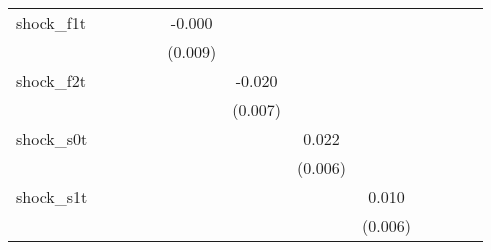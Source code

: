 {\begin{tabular}{l*{12}{c}}
\addlinespace
shock\_f1t   &                     &                     &                     &                     &      -0.000         &                     &                     &                     &                     &                     &                     &                     \\
            &                     &                     &                     &                     &     (0.009)         &                     &                     &                     &                     &                     &                     &                     \\
\addlinespace
shock\_f2t   &                     &                     &                     &                     &                     &      -0.020\sym{**} &                     &                     &                     &                     &                     &                     \\
            &                     &                     &                     &                     &                     &     (0.007)         &                     &                     &                     &                     &                     &                     \\
\addlinespace
shock\_s0t   &                     &                     &                     &                     &                     &                     &       0.022\sym{***}&                     &                     &                     &                     &                     \\
            &                     &                     &                     &                     &                     &                     &     (0.006)         &                     &                     &                     &                     &                     \\
\addlinespace
shock\_s1t   &                     &                     &                     &                     &                     &                     &                     &       0.010         &                     &                     &                     &                     \\
            &                     &                     &                     &                     &                     &                     &                     &     (0.006)         &                     &                     &                     &                     \\

\end{tabular}}
